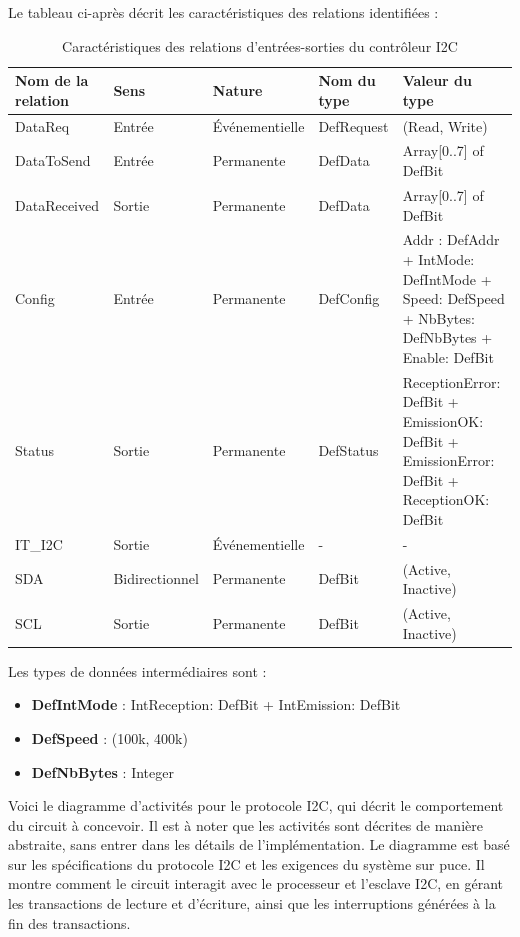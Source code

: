 Le tableau ci-après décrit les caractéristiques des relations identifiées : 

\begin{table}[htbp]
    \centering
    \caption{Caractéristiques des relations d'entrées-sorties du contrôleur I2C}
    \label{tab:relations_es_i2c}
    \small
    \setlength{\tabcolsep}{4pt}
    \begin{tabularx}{\textwidth}{|>{\raggedright\arraybackslash}X|>{\centering\arraybackslash}p{2.2cm}|>{\centering\arraybackslash}p{2.3cm}|>{\raggedright\arraybackslash}X|>{\raggedright\arraybackslash}X|}
        \hline
        \textbf{Nom de la relation} & \textbf{Sens} & \textbf{Nature} & \textbf{Nom du type} & \textbf{Valeur du type} \\ \hline
        DataReq & Entrée & Événementielle & DefRequest & (Read, Write) \\ \hline
        DataToSend & Entrée & Permanente & DefData & Array[0..7] of DefBit \\ \hline
        DataReceived & Sortie & Permanente & DefData & Array[0..7] of DefBit \\ \hline
        Config & Entrée & Permanente & DefConfig & Addr : DefAddr + IntMode: DefIntMode + Speed: DefSpeed + NbBytes: DefNbBytes + Enable: DefBit \\ \hline
        Status & Sortie & Permanente & DefStatus & ReceptionError: DefBit + EmissionOK: DefBit + EmissionError: DefBit + ReceptionOK: DefBit\\ \hline
        IT\_I2C & Sortie & Événementielle & - & - \\ \hline
        SDA & Bidirectionnel & Permanente & DefBit & (Active, Inactive) \\ \hline
        SCL & Sortie & Permanente & DefBit & (Active, Inactive) \\ \hline
    \end{tabularx}
\end{table}

\noindent Les types de données intermédiaires sont :
\begin{itemize}
    \item \textbf{DefIntMode} : IntReception: DefBit + IntEmission: DefBit
    \item \textbf{DefSpeed} : (100k, 400k)
    \item \textbf{DefNbBytes} : Integer
\end{itemize}

Voici le diagramme d'activités pour le protocole I2C, qui décrit le comportement du circuit à concevoir. Il est à noter que les activités sont décrites de manière abstraite, sans entrer dans les détails de l'implémentation. Le diagramme est basé sur les spécifications du protocole I2C et les exigences du système sur puce. Il montre comment le circuit interagit avec le processeur et l'esclave I2C, en gérant les transactions de lecture et d'écriture, ainsi que les interruptions générées à la fin des transactions.

